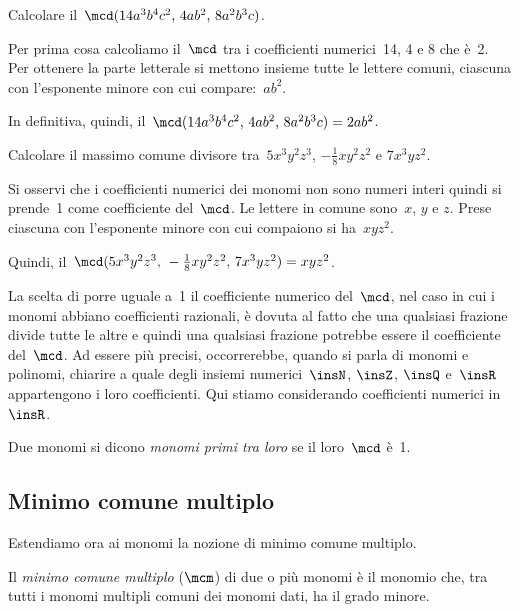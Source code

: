 \begin{exrig}
 \begin{esempio}
Calcolare il~$\mcd (14a^{3}b^{4}c^{2}\text{,~}4ab^{2}\text{,~}8a^{2}b^{3}c)$.

Per prima cosa calcoliamo il~$\mcd$ tra i coefficienti numerici~14, 4 e
8 che è~2. Per ottenere la parte letterale si mettono insieme tutte
le lettere comuni, ciascuna con l'esponente minore con
cui compare:~$ab^{2}$.

In definitiva, quindi, il~$\mcd (14a^{3}b^{4}c^{2}\text{,~}4ab^{2}\text{,~}8a^{2}b^{3}c)=2ab^{2}$.
 \end{esempio}

 \begin{esempio}
Calcolare il massimo comune divisore tra~$5x^{3}y^{2}z^{3}$, $-\frac{1}{8}xy^{2}z^{2}$ e $7x^{3}yz^{2}$.

Si osservi che i coefficienti numerici dei monomi non sono numeri interi
quindi si prende~1 come coefficiente del~$\mcd$.
Le lettere in comune sono~$x$, $y$ e $z$. Prese ciascuna con
l'esponente minore con cui compaiono si ha~$xyz^{2}$.

Quindi, il~$\mcd (5x^{3}y^{2}z^{3}\text{,~}-\frac{1}{8}xy^{2}z^{2}\text{,~}7x^{3}yz^{2})=xyz^{2}$.
 \end{esempio}
\end{exrig}

\osservazione La scelta di porre uguale a~1 il coefficiente numerico del~$\mcd$, nel
caso in cui i monomi abbiano coefficienti razionali, è dovuta al
fatto che una qualsiasi frazione divide tutte le altre e quindi una
qualsiasi frazione potrebbe essere il coefficiente del~$\mcd$. Ad essere
più precisi, occorrerebbe, quando si parla di monomi e polinomi,
chiarire a quale degli insiemi numerici~$\insN$, $\insZ$, $\insQ$ e~$\insR$ appartengono i loro
coefficienti. Qui stiamo considerando coefficienti numerici in~$\insR$.

\begin{definizione}
 Due monomi si dicono \emph{monomi primi tra loro} se il loro~$\mcd$ è~1.
\end{definizione}


\subsection{Minimo comune multiplo}

Estendiamo ora ai monomi la nozione di minimo comune multiplo.

\begin{definizione}
 Il \emph{minimo comune multiplo} ($\mcm$) di due o più monomi
è il monomio che, tra tutti i monomi multipli comuni dei monomi dati,
ha il grado minore.
\end{definizione}

